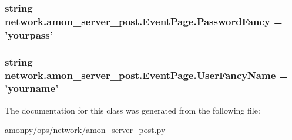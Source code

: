 \hypertarget{classnetwork_1_1amon__server__post_1_1_event_page_abf3ce23699c9adfa3508cda1192998c1}{
\subsubsection[{Password\-Fancy}]{\setlength{\rightskip}{0pt plus 5cm}string network.\-amon\-\_\-server\-\_\-post.\-Event\-Page.\-Password\-Fancy = 'yourpass'\hspace{0.3cm}{\ttfamily [static]}}}\label{classnetwork_1_1amon__server__post_1_1_event_page_abf3ce23699c9adfa3508cda1192998c1}
\hypertarget{classnetwork_1_1amon__server__post_1_1_event_page_a99e287cd9a0c3fa9663a18101606fe7c}{
\subsubsection[{User\-Fancy\-Name}]{\setlength{\rightskip}{0pt plus 5cm}string network.\-amon\-\_\-server\-\_\-post.\-Event\-Page.\-User\-Fancy\-Name = 'yourname'\hspace{0.3cm}{\ttfamily [static]}}}\label{classnetwork_1_1amon__server__post_1_1_event_page_a99e287cd9a0c3fa9663a18101606fe7c}


The documentation for this class was generated from the following file\-:\begin{DoxyCompactItemize}
\item 
amonpy/ops/network/\hyperlink{ops_2network_2amon__server__post_8py}{amon\-\_\-server\-\_\-post.\-py}\end{DoxyCompactItemize}

